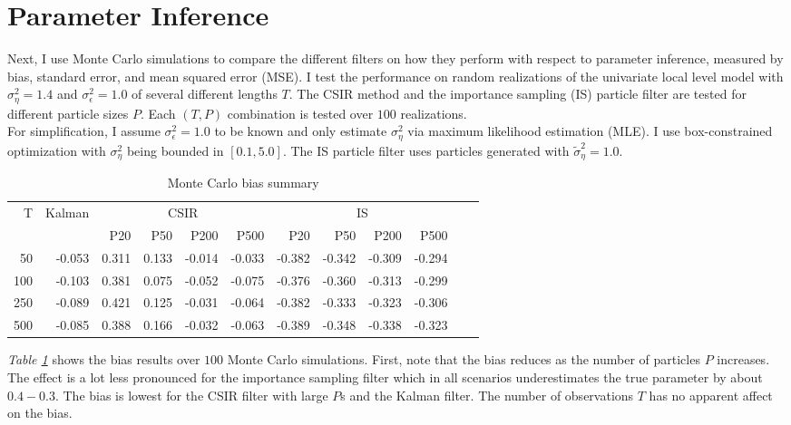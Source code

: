 \documentclass[11pt, oneside]{scrreprt}   	%
\begin{document}
\section{Parameter Inference}
Next, I use Monte Carlo simulations to compare the different filters on how they perform with respect to parameter inference, measured by bias, standard error, and mean squared error (MSE). I test the performance on random realizations of the univariate local level model with $\sigma_{\eta}^2=1.4$ and $\sigma_{\epsilon}^2=1.0$ of several different lengths $T$. The CSIR method and the importance sampling (IS) particle filter are tested for different particle sizes $P$. Each $(T, P)$ combination is tested over $100$ realizations.\\

For simplification, I assume $\sigma_{\epsilon}^2=1.0$ to be known and only estimate $\sigma_{\eta}^2$ via maximum likelihood estimation (MLE). I use box-constrained optimization with $\sigma_{\eta}^2$ being bounded in $[0.1, 5.0]$. The IS particle filter uses particles generated with $\tilde{\sigma}_{\eta}^2=1.0$.


\begin{table}[h!]
\centering
\begin{tabular}{rrrrrrrrrrrr}
\hline
T  & Kalman &  \multicolumn{4}{c}{CSIR} &  \multicolumn{4}{c}{IS}\\
\cline{3-10}
& & P20 & P50 & P200 & P500 & P20 & P50 & P200 & P500\\
\hline
50        & -0.053 & 0.311 & 0.133 & -0.014 & -0.033 & -0.382 & -0.342 & -0.309 & -0.294\\
100      & -0.103 & 0.381 & 0.075 & -0.052 & -0.075 & -0.376 & -0.360 & -0.313 & -0.299\\
250      & -0.089 & 0.421 & 0.125 & -0.031 & -0.064 & -0.382 & -0.333 & -0.323 & -0.306\\
500      & -0.085 & 0.388 & 0.166 & -0.032 & -0.063 & -0.389 & -0.348 & -0.338 & -0.323\\
\hline
\end{tabular}
\caption{Monte Carlo bias summary}
\label{tab:param_inference_bias}
\end{table}

\textit{Table \ref{tab:param_inference_bias}} shows the bias results over $100$ Monte Carlo simulations. First, note that the bias reduces as the number of particles $P$ increases. The effect is a lot less pronounced for the importance sampling filter which in all scenarios underestimates the true parameter by about $0.4-0.3$. The bias is lowest for the CSIR filter with large $P$s and the Kalman filter. The number of observations $T$ has no apparent affect on the bias.\\
\end{document}
